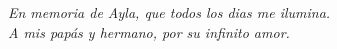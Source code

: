 \newpage \vspace*{8cm}
\thispagestyle{empty}

\begin{flushright}
   \emph{En memoria de Ayla, que todos los dias me ilumina.}\\
   \emph{A mis pap\'as y hermano, por su infinito amor.}
\end{flushright}
